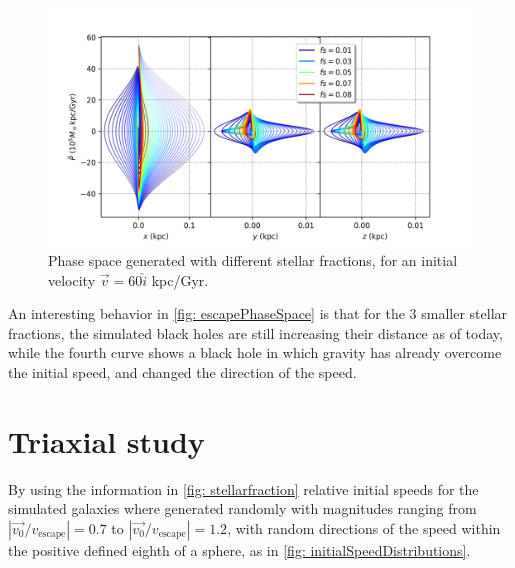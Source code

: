 	\begin{figure}[h]
		\centering
		\includegraphics[width = 0.9\linewidth]{"../Files/Week 9/PhaseSpace_in"}
		\caption{Phase space generated with different stellar fractions, for an initial velocity $\vec{v} = 60\hat{i}$ kpc/Gyr.}
		\label{fig: escapeInner}
	\end{figure}

	An interesting behavior in \autoref{fig: escapePhaseSpace} is that for the 3 smaller stellar fractions, the simulated black holes are still increasing their distance as of today, while the fourth curve shows a black hole in which gravity has already overcome the initial speed, and changed the direction of the speed.
	
	\section{Triaxial study}
	By using the information in \autoref{fig: stellarfraction} relative initial speeds for the simulated galaxies where generated randomly with magnitudes ranging from $|\vec{v_0}/v_{\text{escape}}| = 0.7$ to $|\vec{v_0}/v_{\text{escape}}| = 1.2$, with random directions of the speed within the positive defined eighth of a sphere, as in \autoref{fig: initialSpeedDistributions}.
	
